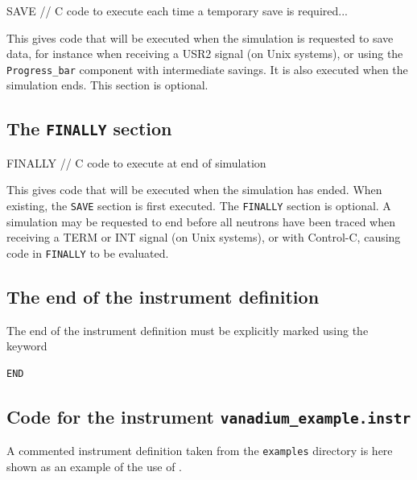 \begin{mcstas}
SAVE 
  // C code to execute each time a temporary save is required...
\end{mcstas} 

This gives code that will be
executed when the simulation is requested to save data, for instance when
receiving a USR2 signal (on Unix systems), or using the \verb+Progress_bar+
component with intermediate savings. It is also executed when the simulation
ends. This section is optional.

\subsection{The \texttt{FINALLY} section}
\label{s:finally}

\begin{mcstas}
FINALLY
   // C code to execute at end of simulation
\end{mcstas}
This gives code that will be executed when the simulation has
ended. When existing, the \texttt{SAVE} section is first executed. The
\texttt{FINALLY} section is optional.
A simulation may be requested to end before all neutrons have been
traced when receiving a TERM or INT signal (on Unix systems), or with
Control-C, causing code in \texttt{FINALLY} to be evaluated.


\subsection{The end of the instrument definition}
\label{s:end}

The end of the instrument definition must be explicitly marked using the keyword
\begin{lstlisting}
END
\end{lstlisting}

\subsection{Code for the instrument \texttt{vanadium\_example.instr}}
\label{s:Samples_vanadium.instr}
A commented instrument definition taken from the \texttt{examples} directory is
here shown as an example of the use of \MCS.



